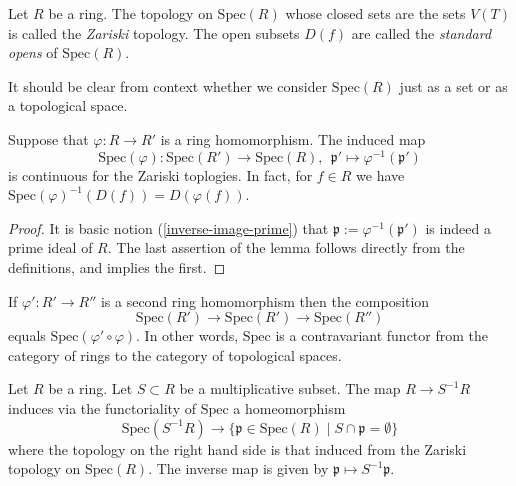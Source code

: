 \begin{definition}
\label{definition-Zariski-topology}
Let $R$ be a ring.
The topology on $\text{Spec}(R)$ whose closed sets are the
sets $V(T)$ is called the {\it Zariski} topology. The open
subsets $D(f)$ are called the {\it standard opens} of $\text{Spec}(R)$.
\end{definition}

\noindent
It should be clear from context whether we consider $\text{Spec}(R)$
just as a set or as a topological space.

\begin{lemma}
\label{lemma-spec-functorial}
Suppose that $\varphi : R \to R'$ is a ring homomorphism.
The induced map
$$
\text{Spec}(\varphi) :
\text{Spec}(R')
\longrightarrow
\text{Spec}(R),\ \ 
\mathfrak p'
\longmapsto
\varphi^{-1}(\mathfrak p')
$$
is continuous for the Zariski toplogies. In fact, for
$f \in R$ we have
$\text{Spec}(\varphi)^{-1}(D(f)) = D(\varphi(f))$.
\end{lemma}

\begin{proof}
It is basic notion (\ref{inverse-image-prime}) that
$\mathfrak p := \varphi^{-1}(\mathfrak p')$
is indeed a prime ideal of $R$. The last assertion
of the lemma follows directly from the definitions,
and implies the first.
\end{proof}

\noindent
If $\varphi' : R' \to R''$ is a second ring homomorphism
then the composition
$$
\text{Spec}(R')
\longrightarrow
\text{Spec}(R')
\longrightarrow
\text{Spec}(R'')
$$
equals $\text{Spec}(\varphi' \circ \varphi)$. In other
words, $\text{Spec}$ is a contravariant functor from the
category of rings to the category of topological spaces.


\begin{lemma}
\label{lemma-spec-localization}
Let $R$ be a ring. Let $S \subset R$ be a multiplicative subset.
The map $R \to S^{-1}R$ induces via the functoriality of $\text{Spec}$
a homeomorphism 
$$
\text{Spec}(S^{-1}R)
\longrightarrow 
\{\mathfrak p \in \text{Spec}(R) \mid S \cap \mathfrak p = \emptyset \}
$$
where the topology on the right hand side is that induced from the
Zariski topology on $\text{Spec}(R)$. The inverse map is given
by $\mathfrak p \mapsto S^{-1}\mathfrak p$.
\end{lemma}

